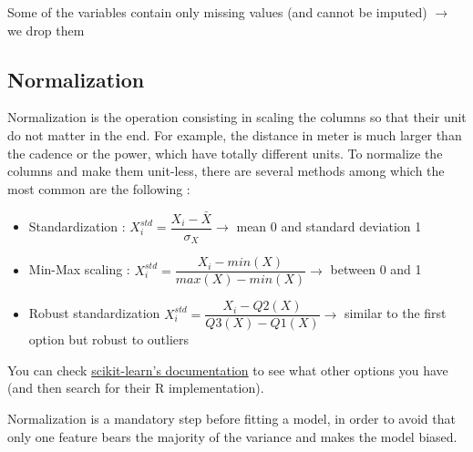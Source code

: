 \documentclass[
]{book}
\newenvironment{Shaded}{\begin{snugshade}}{\end{snugshade}}
\newcommand{\ControlFlowTok}[1]{\textcolor[rgb]{0.13,0.29,0.53}{\textbf{#1}}}
\newcommand{\DecValTok}[1]{\textcolor[rgb]{0.00,0.00,0.81}{#1}}
\newcommand{\KeywordTok}[1]{\textcolor[rgb]{0.13,0.29,0.53}{\textbf{#1}}}
\newcommand{\NormalTok}[1]{#1}
\newcommand{\OperatorTok}[1]{\textcolor[rgb]{0.81,0.36,0.00}{\textbf{#1}}}
\newcommand{\StringTok}[1]{\textcolor[rgb]{0.31,0.60,0.02}{#1}}
\providecommand{\tightlist}{%
  \setlength{\itemsep}{0pt}\setlength{\parskip}{0pt}}
\begin{document}
Some of the variables contain only missing values (and cannot be imputed) \(\rightarrow\) we drop them

\begin{Shaded}
\end{Shaded}

\hypertarget{normalization}{%
\subsection{Normalization}\label{normalization}}

Normalization is the operation consisting in scaling the columns so that their unit do not matter in the end. For example, the distance in meter is much larger than the cadence or the power, which have totally different units. To normalize the columns and make them unit-less, there are several methods among which the most common are the following :

\begin{itemize}
\tightlist
\item
  Standardization : \(X_i^{std} = \dfrac{X_i-\bar{X}}{\sigma_X} \rightarrow\) mean 0 and standard deviation 1
\item
  Min-Max scaling : \(X_i^{std} = \dfrac{X_i-min(X)}{max(X)-min(X)} \rightarrow\) between 0 and 1
\item
  Robust standardization \(X_i^{std} = \dfrac{X_i-Q2(X)}{Q3(X)-Q1(X)} \rightarrow\) similar to the first option but robust to outliers
\end{itemize}

You can check \href{https://scikit-learn.org/stable/modules/classes.html\#module-sklearn.preprocessing}{scikit-learn's documentation} to see what other options you have (and then search for their R implementation).

Normalization is a mandatory step before fitting a model, in order to avoid that only one feature bears the majority of the variance and makes the model biased.
\end{document}
